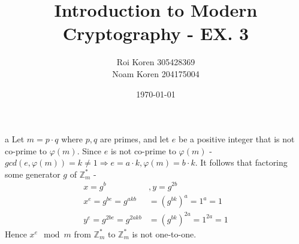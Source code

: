 \documentclass{article}
\begin{document}
\title{Introduction to Modern Cryptography - EX. 3}
\author{Roi Koren 305428369\\ Noam Koren 204175004}
\date{\today}
\maketitle
\newpage
{}

\section{}
\begin{paragraph}
	a Let $m=p\cdot q$ where $p,q$ are primes, and let $e$ be a positive integer that is not co-prime to $\varphi(m)$. Since $e$ is not co-prime to $\varphi(m)$ - $gcd(e, \varphi(m)) = k \neq 1 \Rightarrow e = a\cdot k, \varphi(m) = b\cdot k$. It follows that factoring some generator $g$ of $\mathbb{Z}^*_m$ - 
	\begin{align*}
		x = g^b&, y = g^{2b}\\
		x^e = g^{be} = g^{akb} &= (g^{bk})^a = 1^a = 1 \\
		y^e = g^{2be} = g^{2akb} &= (g^{bk})^{2a} = 1^{2a} = 1
	\end{align*}
	Hence $x^e \mod m$ from $\mathbb{Z}^*_m$ to $\mathbb{Z}^*_m$ is not one-to-one.
\end{paragraph}
\end{document}
